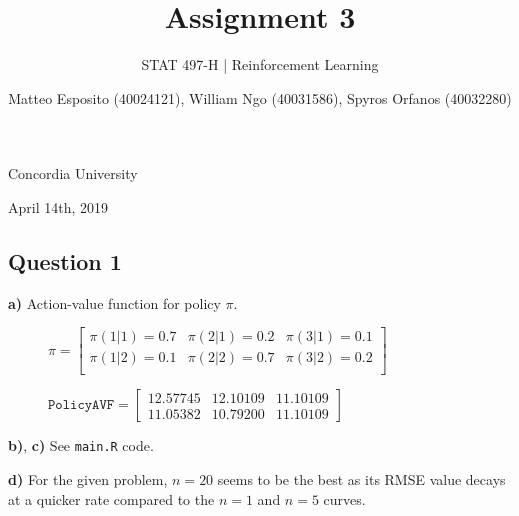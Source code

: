 \documentclass[a4paper,12pt]{article}
\title{\textbf{Assignment 3}}
\author{STAT 497-H | Reinforcement Learning}
\date{Matteo Esposito (40024121), William Ngo (40031586), Spyros Orfanos (40032280)}
\def\code#1{\texttt{#1}}
\begin{document}
\begin{titlingpage}
  \maketitle
  \centering
  \vfill
  {\large{Concordia University}}\par
  {\large{April 14th, 2019}}
\end{titlingpage}

\newpage

\subsection*{Question 1}

\textbf{a)} Action-value function for policy $\pi$.

\begin{figure}[ht]
  \centering
    $\pi
    =
    \begin{bmatrix}
      \pi(1|1) = 0.7 & \pi(2|1) = 0.2 & \pi(3|1) = 0.1 \\
      \pi(1|2) = 0.1 & \pi(2|2) = 0.7 & \pi(3|2) = 0.2 \\
    \end{bmatrix}$       
  \end{figure}

\begin{figure}[ht]
  \centering
    $\code{PolicyAVF}
    =
    \begin{bmatrix}
      12.57745 & 12.10109 & 11.10109 \\
      11.05382 & 10.79200 & 11.10109
    \end{bmatrix}$       
\end{figure}

\textbf{b)}, \textbf{c)} See \code{main.R} code.


\textbf{d)} For the given problem, $n=20$ seems to be the best as its RMSE value decays
at a quicker rate compared to the $n=1$ and $n=5$ curves. 
\end{document}
